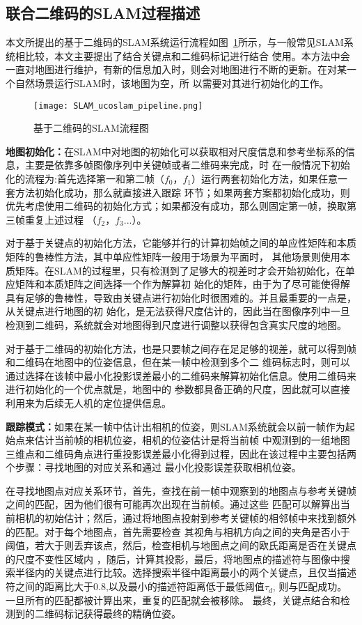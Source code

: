 \subsection{联合二维码的SLAM过程描述}
\label{sec:2.3.3}
本文所提出的基于二维码的SLAM系统运行流程如图~\ref{fig:SLAM_ucoslam_pipeline}所示，与一般常见SLAM系统相比较，本文主要提出了结合关键点和二维码标记进行结合
使用。本方法中会一直对地图进行维护，有新的信息加入时，则会对地图进行不断的更新。在对某一个自然场景运行SLAM时，该地图为空，所
以需要对其进行初始化的工作。
\begin{figure}[H] %
  \centering
  \texttt{[image: SLAM\_ucoslam\_pipeline.png]}
  \caption{基于二维码的SLAM流程图}
  \label{fig:SLAM_ucoslam_pipeline}
\end{figure}
\textbf{地图初始化：}在SLAM中对地图的初始化可以获取相对尺度信息和参考坐标系的信息，主要是依靠多帧图像序列中关键帧或者二维码来完成，时
在一般情况下初始化的流程为:首先选择第一和第二帧（$f_0$，$f_1$）运行两套初始化方法，如果任意一套方法初始化成功，那么就直接进入跟踪
环节；如果两套方案都初始化成功，则优先考虑使用二维码的初始化方式；如果都没有成功，那么则固定第一帧，换取第三帧重复上述过程
（$f_2$，$f_3$...）。

对于基于关键点的初始化方法，它能够并行的计算初始帧之间的单应性矩阵和本质矩阵的鲁棒性方法，其中单应性矩阵一般用于场景为平面时，
其他场景则使用本质矩阵。在SLAM的过程里，只有检测到了足够大的视差时才会开始初始化，在单应矩阵和本质矩阵之间选择一个作为解算初
始化的矩阵，由于为了尽可能使得解具有足够的鲁棒性，导致由关键点进行初始化时很困难的。并且最重要的一点是，从关键点进行地图的初
始化，是无法获得尺度估计的，因此当在图像序列中一旦检测到二维码，系统就会对地图得到尺度进行调整以获得包含真实尺度的地图。

对于基于二维码的初始化方法，也是只要帧之间存在足足够的视差，就可以得到帧和二维码在地图中的位姿信息，但在某一帧中检测到多个二
维码标志时，则可以通过选择在该帧中最小化投影误差最小的二维码来解算初始化信息。使用二维码来进行初始化的一个优点就是，地图中的
参数都具备正确的尺度，因此就可以直接利用来为后续无人机的定位提供信息。

\textbf{跟踪模式：}如果在某一帧中估计出相机的位姿，则SLAM系统就会以前一帧作为起始点来估计当前帧的相机位姿，相机的位姿估计是将当前帧
中观测到的一组地图三维点和二维码角点进行重投影误差最小化得到过程，因此在该过程中主要包括两个步骤：寻找地图的对应关系和通过
最小化投影误差获取相机位姿。

在寻找地图点对应关系环节，首先，查找在前一帧中观察到的地图点与参考关键帧之间的匹配，因为他们很有可能再次出现在当前帧。通过这些
匹配可以解算出当前相机的初始估计；然后，通过将地图点投射到参考关键帧的相邻帧中来找到额外的匹配。对于每个地图点，首先需要检查
其视角与相机方向之间的夹角是否小于阈值，若大于则丢弃该点，然后，检查相机与地图点之间的欧氏距离是否在关键点的尺度不变性区域内
，随后，计算其投影，最后，将地图点的描述符与图像中搜索半径内的关键点进行比较。选择搜索半径中距离最小的两个关键点，且仅当描述
符之间的距离比大于0.8,以及最小的描述符距离低于最低阈值$\tau_d$, 则与匹配成功。一旦所有的匹配都被计算出来，重复的匹配就会被移除。
最终，关键点结合和检测到的二维码标记获得最终的精确位姿。

